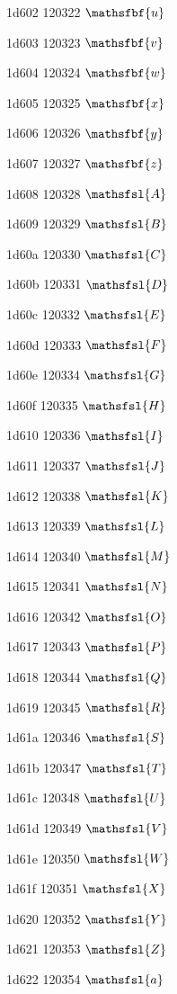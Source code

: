 \documentclass[11pt]{article}
\begin{document}
1d602 120322 \ensuremath{\mathsfbf{u}}

1d603 120323 \ensuremath{\mathsfbf{v}}

1d604 120324 \ensuremath{\mathsfbf{w}}

1d605 120325 \ensuremath{\mathsfbf{x}}

1d606 120326 \ensuremath{\mathsfbf{y}}

1d607 120327 \ensuremath{\mathsfbf{z}}

1d608 120328 \ensuremath{\mathsfsl{A}}

1d609 120329 \ensuremath{\mathsfsl{B}}

1d60a 120330 \ensuremath{\mathsfsl{C}}

1d60b 120331 \ensuremath{\mathsfsl{D}}

1d60c 120332 \ensuremath{\mathsfsl{E}}

1d60d 120333 \ensuremath{\mathsfsl{F}}

1d60e 120334 \ensuremath{\mathsfsl{G}}

1d60f 120335 \ensuremath{\mathsfsl{H}}

1d610 120336 \ensuremath{\mathsfsl{I}}

1d611 120337 \ensuremath{\mathsfsl{J}}

1d612 120338 \ensuremath{\mathsfsl{K}}

1d613 120339 \ensuremath{\mathsfsl{L}}

1d614 120340 \ensuremath{\mathsfsl{M}}

1d615 120341 \ensuremath{\mathsfsl{N}}

1d616 120342 \ensuremath{\mathsfsl{O}}

1d617 120343 \ensuremath{\mathsfsl{P}}

1d618 120344 \ensuremath{\mathsfsl{Q}}

1d619 120345 \ensuremath{\mathsfsl{R}}

1d61a 120346 \ensuremath{\mathsfsl{S}}

1d61b 120347 \ensuremath{\mathsfsl{T}}

1d61c 120348 \ensuremath{\mathsfsl{U}}

1d61d 120349 \ensuremath{\mathsfsl{V}}

1d61e 120350 \ensuremath{\mathsfsl{W}}

1d61f 120351 \ensuremath{\mathsfsl{X}}

1d620 120352 \ensuremath{\mathsfsl{Y}}

1d621 120353 \ensuremath{\mathsfsl{Z}}

1d622 120354 \ensuremath{\mathsfsl{a}}
\end{document}
